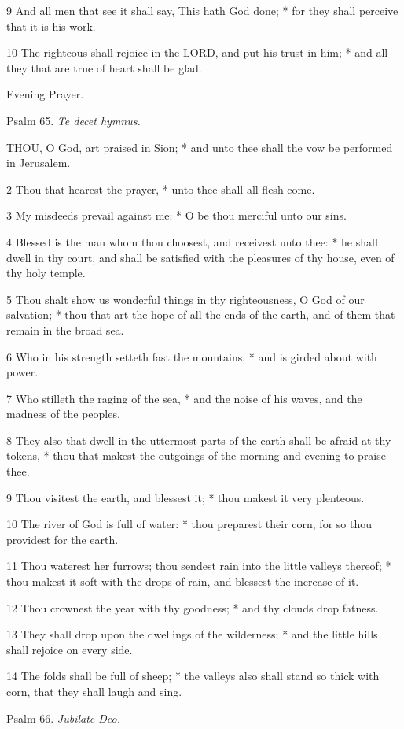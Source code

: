 9 And all men that see it shall say, This hath God
done; * for they shall perceive that it is his work.

10 The righteous shall rejoice in the LORD, and put
his trust in him; * and all they that are true of heart shall be glad.

Evening
Prayer.

Psalm
65. \emph{Te decet hymnus.}

THOU,
O God, art praised in Sion; * and unto thee shall the vow be performed
in Jerusalem.

2 Thou that hearest the prayer, * unto thee shall all
flesh come.

3 My misdeeds prevail against me: * O be thou merciful
unto our sins.

4 Blessed is the man whom thou choosest, and receivest
unto thee: * he shall dwell in thy court, and shall be satisfied with
the pleasures of thy house, even of thy holy temple.

5 Thou shalt show us wonderful things in thy righteousness,
O God of our salvation; * thou that art the hope of all the ends of the
earth, and of them that remain in the broad sea.

6 Who in his strength setteth fast the mountains, *
and is girded about with power.

7 Who stilleth the raging of the sea, * and the noise
of his waves, and the madness of the peoples.

8 They also that dwell in the uttermost parts of the
earth shall be afraid at thy tokens, * thou that makest the outgoings
of the morning and evening to praise thee.

9 Thou visitest the earth, and blessest it; * thou
makest it very plenteous.

10 The river of God is full of water: * thou preparest
their corn, for so thou providest for the earth.

11 Thou waterest her furrows; thou sendest rain into
the little valleys thereof; * thou makest it soft with the drops of rain,
and blessest the increase of it.

12 Thou crownest the year with thy goodness; * and
thy clouds drop fatness.

13 They shall drop upon the dwellings of the wilderness;
* and the little hills shall rejoice on every side.

14 The folds shall be full of sheep; * the valleys
also shall stand so thick with corn, that they shall laugh and sing.

Psalm
66. \emph{Jubilate Deo.}

